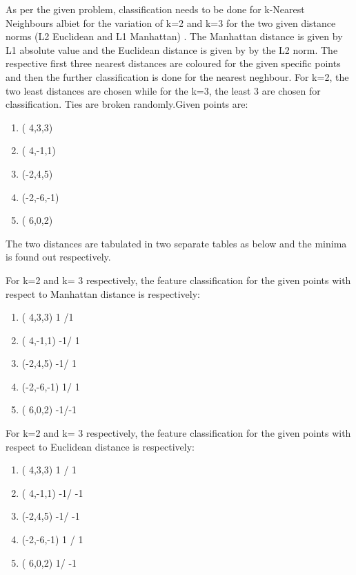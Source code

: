

As per the given problem, classification needs to be done for k-Nearest Neighbours albiet for the variation of k=2 and k=3 for the two given distance norms (L2 Euclidean and L1 Manhattan) . The Manhattan distance is given by L1 absolute value and the Euclidean distance is given by by the L2 norm.
 The respective first three nearest distances are coloured for the given specific points and then the further classification is done for the nearest neghbour. For k=2, the two least distances are chosen while for the k=3, the least 3 are chosen for classification. Ties are broken randomly.Given points are:
\begin {enumerate}
	\item( 4,3,3)   
	\item( 4,-1,1)  
	\item(-2,4,5)   
	\item(-2,-6,-1) 
	\item( 6,0,2)  
\end {enumerate}
The two distances are tabulated in two separate tables as below and the minima is found out respectively.


For k=2 and k= 3 respectively, the feature classification for the given points with respect to Manhattan distance is respectively:
\begin {enumerate}
	\item( 4,3,3)      1 /1
	\item( 4,-1,1)    -1/ 1
	\item(-2,4,5)     -1/ 1
	\item(-2,-6,-1)    1/ 1
	\item( 6,0,2)      -1/-1
\end {enumerate}
For k=2 and k= 3 respectively, the feature classification for the given points with respect to Euclidean distance is respectively:
\begin {enumerate}
	\item( 4,3,3)     1 /  1
	\item( 4,-1,1)   -1/ -1
	\item(-2,4,5)    -1/ -1
	\item(-2,-6,-1)   1 / 1
	\item( 6,0,2)      1/ -1
\end {enumerate}
